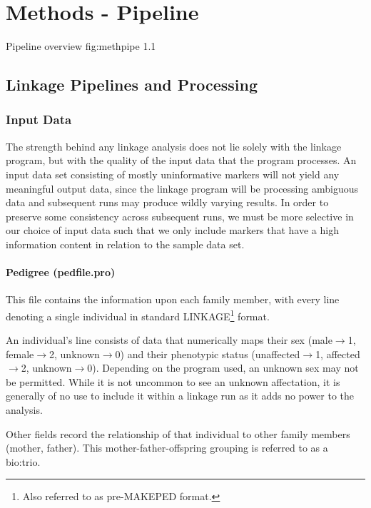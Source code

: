\chapter{Methods - Pipeline}

	{Pipeline overview}
	{fig:methpipe}
	{1.1}

\section{Linkage Pipelines and Processing}



\subsection{Input Data}

The strength behind any linkage analysis does not lie solely with the linkage program, but with the quality of the input data that the program processes. An input data set consisting of mostly uninformative markers will not yield any meaningful output data, since the linkage program will be processing ambiguous data and subsequent runs may produce wildly varying results. In order to preserve some consistency across subsequent runs, we must be more selective in our choice of input data such that we only include markers that have a high information content in relation to the sample data set.

\subsubsection{Pedigree (pedfile.pro)}

This file contains the information upon each family member, with every line denoting a single individual in standard LINKAGE\footnote{Also referred to as pre-MAKEPED format.} format. 

An individual's line consists of data that numerically maps their sex ({male\(\rightarrow\)1, female\(\rightarrow\)2,  unknown\(\rightarrow\)0}) and their phenotypic status ({unaffected\(\rightarrow\)1, affected\(\rightarrow\)2,  unknown\(\rightarrow\)0}). Depending on the program used, an unknown sex may not be permitted. While it is not uncommon to see an unknown affectation, it is generally of no use to include it within a linkage run as it adds no power to the analysis. 

Other fields record the relationship of that individual to other family members (mother, father). This mother-father-offspring grouping is referred to as a \gls{bio:trio}. 

